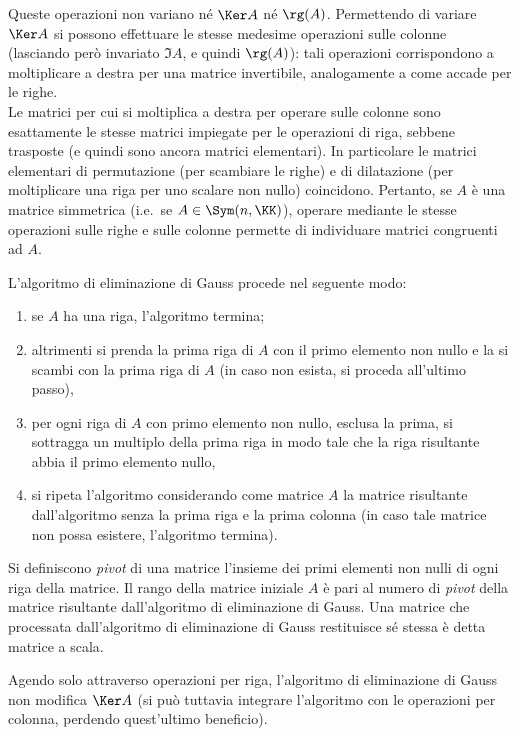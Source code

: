 \documentclass[10pt,landscape]{article}
\begin{document}
\begin{multicols}{3}
		Queste operazioni non variano né $\Ker A$ né $\rg (A)$. Permettendo di variare $\Ker A$ si possono effettuare le stesse medesime operazioni
		sulle colonne (lasciando però
		invariato $\Im A$, e quindi $\rg (A)$): tali operazioni corrispondono a moltiplicare a destra per una matrice invertibile, analogamente a come accade per le righe. \\
		
		Le matrici per cui si moltiplica a destra per operare sulle colonne sono esattamente le stesse matrici impiegate
		per le operazioni di riga, sebbene trasposte (e quindi sono ancora matrici elementari). In particolare le matrici elementari di permutazione (per scambiare le righe) e di dilatazione (per moltiplicare una riga per uno scalare non nullo) coincidono. Pertanto, se $A$ è una matrice simmetrica (i.e.~se $A \in \Sym(n, \KK)$), operare mediante le stesse
		operazioni sulle righe e sulle colonne permette di individuare matrici congruenti
		ad $A$.
		
		L'algoritmo di eliminazione di Gauss
		procede nel seguente modo:
		
		\begin{enumerate}
			\item se $A$ ha una riga, l'algoritmo termina;
			\item altrimenti si prenda la prima riga di $A$ con il primo elemento
			non nullo e la si scambi con la prima riga di $A$ (in caso
			non esista, si proceda all'ultimo passo),
			\item per ogni riga di $A$ con primo elemento non nullo,
			esclusa la prima, si sottragga un multiplo della prima riga in modo
			tale che la riga risultante abbia il primo elemento nullo,
			\item si ripeta l'algoritmo considerando come matrice $A$ la
			matrice risultante dall'algoritmo senza la prima riga e la
			prima colonna (in caso tale matrice non possa esistere,
			l'algoritmo termina).
		\end{enumerate}
		
		Si definiscono \textit{pivot} di una matrice l'insieme dei primi
		elementi non nulli di ogni riga della matrice.
		Il rango della matrice iniziale $A$ è pari al numero di \textit{pivot}
		della matrice risultante dall'algoritmo di eliminazione di Gauss.
		Una matrice che processata dall'algoritmo di eliminazione di Gauss
		restituisce sé stessa è detta matrice a scala.
		
		Agendo solo attraverso
		operazioni per riga, l'algoritmo di eliminazione di Gauss non
		modifica $\Ker A$ (si può tuttavia integrare l'algoritmo con le
		operazioni per colonna, perdendo quest'ultimo beneficio).
		

\end{multicols}
\end{document}

